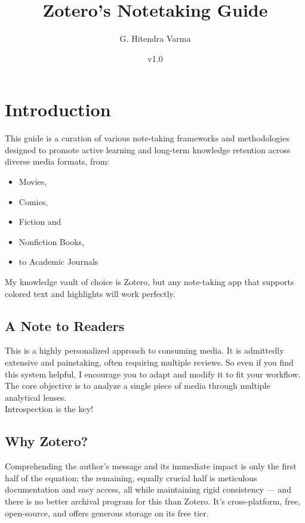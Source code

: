 \documentclass[12pt, a4paper]{article}
\title{Zotero's Notetaking Guide}
\author{G. Hitendra Varma}
\date{v1.0}
\begin{document}
	\maketitle
	
	\section{Introduction}
	This guide is a curation of various note-taking frameworks and methodologies designed to promote active learning and long-term knowledge retention across diverse media formats, from:
	
	\begin{itemize}
		\item Movies,
		\item Comics,
		\item Fiction and
		\item Nonfiction Books,
		\item to Academic Journals
	\end{itemize}
	
	My knowledge vault of choice is Zotero, but any note-taking app that supports colored text and highlights will work perfectly.
	
	\subsection{A Note to Readers}
	This is a highly personalized approach to consuming media. It is admittedly extensive and painstaking, often requiring multiple reviews. So even if you find this system helpful, I encourage you to adapt and modify it to fit your workflow. The core objective is to analyze a single piece of media through multiple analytical lenses.\\ Introspection is the key!
	
	\subsection{Why Zotero?}
	Comprehending the author's message and its immediate impact is only the first half of the equation; the remaining, equally crucial half is meticulous documentation and easy access, all while maintaining rigid consistency --- and there is no better archival program for this than Zotero. It's cross-platform, free, open-source, and offers generous storage on its free tier.
	
	
\end{document}
